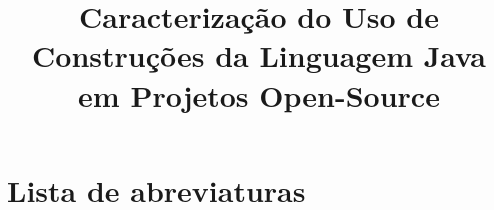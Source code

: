 \documentclass[licenciatura]{unb-cic}
\title{Caracteriza\c c\~{a}o do Uso de Constru\c c\~{o}es da Linguagem Java em Projetos Open-Source}
\begin{document}
  \maketitle
  \pretextual

  \begin{dedicatoria}
	  
  \end{dedicatoria}

  \begin{agradecimentos}
	
  \end{agradecimentos}

  \begin{resumo}
	
  \end{resumo}


  \begin{abstract}
  	
  \end{abstract}
  
  


  \tableofcontents
  \listoffigures
  \listoftables
  
  
  \chapter*{Lista de abreviaturas}
  
  
  

  \textual
 
  
  
  
  
  
  
  \postextual
  
  
	
\end{document}

